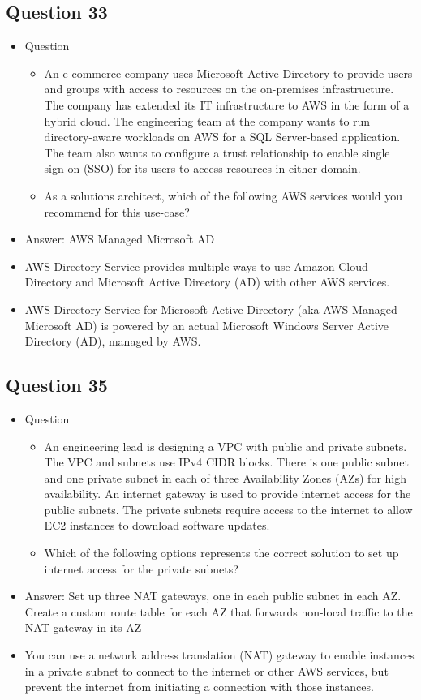 \documentclass[]{scrartcl}
\begin{document}
\subsection{Question 33}
\begin{itemize}
	\item Question
	\begin{itemize}
		\item An e-commerce company uses Microsoft Active Directory to provide users and groups with access to resources on the on-premises infrastructure. The company has extended its IT infrastructure to AWS in the form of a hybrid cloud. The engineering team at the company wants to run directory-aware workloads on AWS for a SQL Server-based application. The team also wants to configure a trust relationship to enable single sign-on (SSO) for its users to access resources in either domain.
		\item As a solutions architect, which of the following AWS services would you recommend for this use-case?
	\end{itemize}
	\item Answer: AWS Managed Microsoft AD
	\item AWS Directory Service provides multiple ways to use Amazon Cloud Directory and Microsoft Active Directory (AD) with other AWS services.
	\item AWS Directory Service for Microsoft Active Directory (aka AWS Managed Microsoft AD) is powered by an actual Microsoft Windows Server Active Directory (AD), managed by AWS. 
\end{itemize}

\subsection{Question 35}
\begin{itemize}
	\item Question
	\begin{itemize}
		\item An engineering lead is designing a VPC with public and private subnets. The VPC and subnets use IPv4 CIDR blocks. There is one public subnet and one private subnet in each of three Availability Zones (AZs) for high availability. An internet gateway is used to provide internet access for the public subnets. The private subnets require access to the internet to allow EC2 instances to download software updates.
		\item Which of the following options represents the correct solution to set up internet access for the private subnets?
	\end{itemize}
	\item Answer: Set up three NAT gateways, one in each public subnet in each AZ. Create a custom route table for each AZ that forwards non-local traffic to the NAT gateway in its AZ
	\item You can use a network address translation (NAT) gateway to enable instances in a private subnet to connect to the internet or other AWS services, but prevent the internet from initiating a connection with those instances.
\end{itemize}
\end{document}
